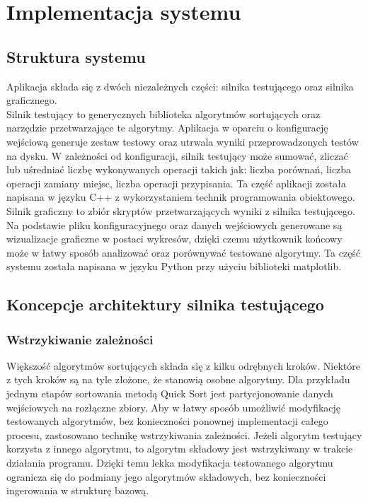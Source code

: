\chapter{Implementacja systemu}
\thispagestyle{chapterBeginStyle}

\section{Struktura systemu}
Aplikacja składa się z dwóch niezależnych części: silnika testującego oraz silnika graficznego.\\

Silnik testujący to generycznych biblioteka algorytmów sortujących oraz narzędzie przetwarzające
te algorytmy. Aplikacja w oparciu o konfigurację wejściową generuje zestaw testowy oraz utrwala
wyniki przeprowadzonych testów na dysku. W zależności od konfiguracji, silnik testujący może
sumować, zliczać lub uśredniać liczbę wykonywanych operacji takich jak: liczba porównań, liczba
operacji zamiany miejsc, liczba operacji przypisania. Ta część aplikacji została napisana w języku
C++ z wykorzystaniem technik programowania obiektowego.\\

Silnik graficzny to zbiór skryptów przetwarzających wyniki z silnika testującego. Na podstawie pliku
konfiguracyjnego oraz danych wejściowych generowane są wizualizacje graficzne w postaci wykresów, dzięki
czemu użytkownik końcowy może w łatwy sposób analizować oraz porównywać testowane algorytmy. Ta część
systemu została napisana w języku Python przy użyciu biblioteki matplotlib.


\section{Koncepcje architektury silnika testującego}

\subsection{Wstrzykiwanie zależności}
Większość algorytmów sortujących składa się z kilku odrębnych kroków. Niektóre z tych kroków są na tyle
złożone, że stanowią osobne algorytmy. Dla przykładu jednym etapów sortowania metodą Quick Sort
jest partycjonowanie danych wejściowych na rozłączne zbiory. Aby w łatwy sposób umożliwić modyfikację
testowanych algorytmów, bez konieczności ponownej implementacji całego procesu, zastosowano technikę
wstrzykiwania zależności. Jeżeli algorytm testujący korzysta z innego algorytmu, to algorytm składowy
jest wstrzykiwany w trakcie działania programu. Dzięki temu lekka modyfikacja testowanego algorytmu
ogranicza się do podmiany jego algorytmów składowych, bez konieczności ingerowania w strukturę bazową.


